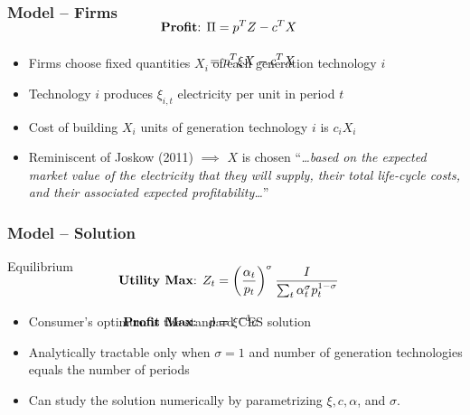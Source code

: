 \documentclass[aspectratio=169]{beamer}
\begin{document}
\begin{frame}
\frametitle{Model -- Firms}


\vspace{1em}
\begin{block}{}
	\small
	\begin{align*}
	\\[-3em] \text{\textbf{Profit}: } &\Pi = p^T Z - c^T X \\[1em]
	&= p^T \xi X - c^T X \\[-2.5em]
	\end{align*}
\end{block}

\begin{itemize}
	\setlength\itemsep{0.25em}
	\item Firms choose fixed quantities $X_i$ of each generation technology $i$ 
	\item Technology $i$ produces $\xi_{i,t}$ electricity per unit in period $t$
	\item Cost of building  $X_i$ units of generation technology $i$ is  $c_i X_i$
	\item Reminiscent of Joskow (2011) $\implies$ $X$ is chosen  ``\textit{\dots based on the expected market value of the electricity that they will supply, their total life-cycle costs, and their associated expected profitability\dots}''
\end{itemize}

\end{frame}

\begin{frame}
\frametitle{Model -- Solution}


\begin{block}{\centering Equilibrium}
	\begin{align*}
	\\[-3em] \text{\textbf{Utility Max}: } Z_t &= \left(\frac{\alpha_t}{p_t} \right)^\sigma \frac{I}{\sum_t \alpha_t^\sigma p_t^{1-\sigma}} \\[1em]
	 \text{\textbf{Profit Max}: \hspace{0.1em} }	p &= \xi^{-1} c \\[-2.5em]
	\end{align*}
\end{block}

\vspace{1em}

\begin{itemize}
	\setlength\itemsep{0.25em}
	\item Consumer's optimum is the standard CES solution
	\item Analytically tractable only when $\sigma = 1$ and number of generation technologies equals the number of periods
	\item Can study the solution numerically by parametrizing $\xi, c, \alpha$, and $\sigma$. 
\end{itemize}


\end{frame}
\end{document}
